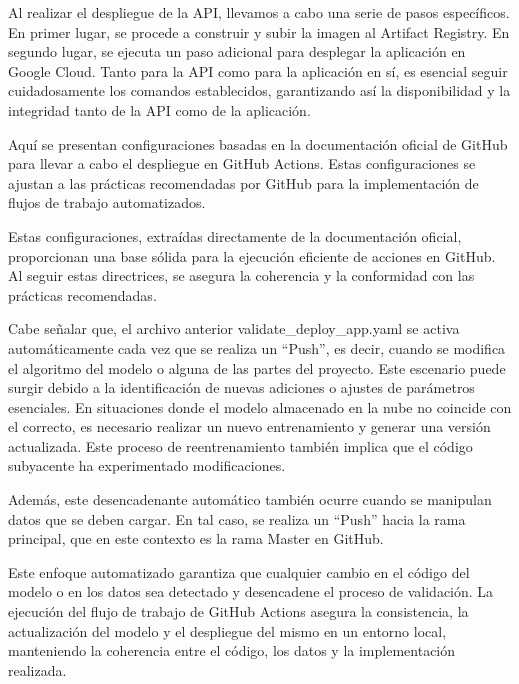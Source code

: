\newpage

Al realizar el despliegue de la API, llevamos a cabo una serie de pasos específicos. En primer lugar, se procede a construir y subir la imagen al Artifact Registry. En segundo lugar, se ejecuta un paso adicional para desplegar la aplicación en Google Cloud. Tanto para la API como para la aplicación en sí, es esencial seguir cuidadosamente los comandos establecidos, garantizando así la disponibilidad y la integridad tanto de la API como de la aplicación. \newline

Aquí se presentan configuraciones basadas en la documentación oficial de GitHub para llevar a cabo el despliegue en GitHub Actions. Estas configuraciones se ajustan a las prácticas recomendadas por GitHub para la implementación de flujos de trabajo automatizados. \newline

Estas configuraciones, extraídas directamente de la documentación oficial, proporcionan una base sólida para la ejecución eficiente de acciones en GitHub. Al seguir estas directrices, se asegura la coherencia y la conformidad con las prácticas recomendadas. \newline

Cabe señalar que, el archivo anterior validate\_deploy\_app.yaml se activa automáticamente cada vez que se realiza un ``Push'', es decir, cuando se modifica el algoritmo del modelo o alguna de las partes del proyecto. Este escenario puede surgir debido a la identificación de nuevas adiciones o ajustes de parámetros esenciales. En situaciones donde el modelo almacenado en la nube no coincide con el correcto, es necesario realizar un nuevo entrenamiento y generar una versión actualizada. Este proceso de reentrenamiento también implica que el código subyacente ha experimentado modificaciones.

\newpage

Además, este desencadenante automático también ocurre cuando se manipulan datos que se deben cargar. En tal caso, se realiza un ``Push'' hacia la rama principal, que en este contexto es la rama Master en GitHub. \newline

Este enfoque automatizado garantiza que cualquier cambio en el código del modelo o en los datos sea detectado y desencadene el proceso de validación. La ejecución del flujo de trabajo de GitHub Actions asegura la consistencia, la actualización del modelo y el despliegue del mismo en un entorno local, manteniendo la coherencia entre el código, los datos y la implementación realizada. \newline

